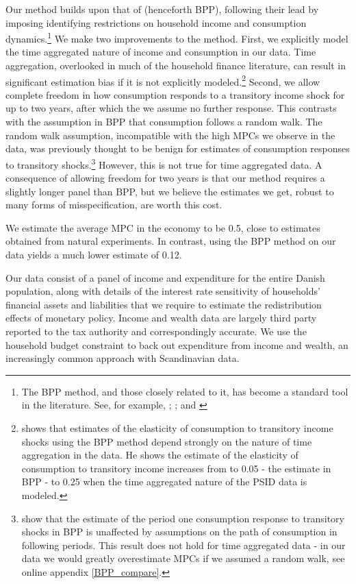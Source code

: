 \documentclass[titlepage]{\econtex}\newcommand{\texname}{ConsumptionHeterogeneity}
\begin{document}
Our method builds upon that of \cite{blundell_consumption_2008} (henceforth BPP), following their lead by imposing identifying restrictions on household income and consumption dynamics.\footnote{The BPP method, and those closely related to it, has become a standard tool in the literature. See, for example, \cite{violante_wealthy_2014}; \cite{auclert_monetary_2017}; and \cite{manovskii_how_2017}} We make two improvements to the method. First, we explicitly model the time aggregated nature of income and consumption in our data. Time aggregation, overlooked in much of the household finance literature, can result in significant estimation bias if it is not explicitly modeled.\footnote{\cite{crawley_time_2019} shows that estimates of the elasticity of consumption to transitory income shocks using the BPP method depend strongly on the nature of time aggregation in the data. He shows the estimate of the elasticity of consumption to transitory income increases from to 0.05 - the estimate in BPP - to 0.25 when the time aggregated nature of the PSID data is modeled.} Second, we allow complete freedom in how consumption responds to a transitory income shock for up to two years, after which the we assume no further response. This contrasts with the assumption in BPP that consumption follows a random walk. The random walk assumption, incompatible with the high MPCs we observe in the data, was previously thought to be benign for estimates of consumption responses to transitory shocks.\footnote{\cite{kaplan_how_2010} show that the estimate of the period one consumption response to transitory shocks in BPP is unaffected by assumptions on the path of consumption in following periods. This result does not hold for time aggregated data - in our data we would greatly overestimate MPCs if we assumed a random walk, see online appendix \ref{BPP_compare}.} However, this is not true for time aggregated data. A consequence of allowing freedom for two years is that our method requires a slightly longer panel than BPP, but we believe the estimates we get, robust to many forms of misspecification, are worth this cost.

We estimate the average MPC in the economy to be 0.5, close to estimates obtained from natural experiments. In contrast, using the BPP method on our data yields a much lower estimate of 0.12.

Our data consist of a panel of income and expenditure for the entire Danish population, along with details of the interest rate sensitivity of households' financial assets and liabilities that we require to estimate the redistribution effects of monetary policy. Income and wealth data are largely third party reported to the tax authority and correspondingly accurate. We use the household budget constraint to back out expenditure from income and wealth, an increasingly common approach with Scandinavian data.
\end{document}

